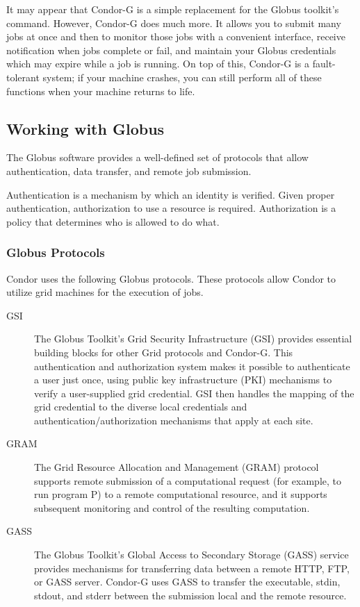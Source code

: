 It may appear that Condor-G is a simple replacement
for the Globus toolkit's  command.
However, Condor-G does much more.
It allows you to submit many jobs at once
and then to monitor those jobs with a convenient interface,
receive notification when jobs complete or fail,
and maintain your Globus credentials
which may expire while a job is running.
On top of this, Condor-G is a fault-tolerant system;
if your machine crashes,
you can still perform all of these functions when your machine returns to life.


\subsection{\label{sec:Globus-intro}Working with Globus}

The Globus software provides a well-defined set of protocols
that allow authentication, data transfer, and remote job submission.

Authentication is a mechanism by which an identity is verified.
Given proper authentication, authorization to use a resource
is required.
Authorization is a policy that determines who is allowed to do what. 


\subsubsection{\label{sec:Globus-Protocols}Globus Protocols}
Condor uses the following Globus protocols.
These protocols allow Condor to utilize grid machines for
the execution of jobs.
\begin{description}
\item[GSI]
The Globus Toolkit's Grid Security Infrastructure (GSI) provides essential
building blocks for other Grid protocols and Condor-G.
This authentication and authorization system
makes it possible to authenticate a user just once,
using public key infrastructure (PKI) mechanisms to verify
a user-supplied grid credential.
GSI then handles the mapping of the grid credential to the
diverse local credentials and authentication/authorization mechanisms that
apply at each site. 
\item[GRAM]
The Grid Resource Allocation and Management (GRAM) protocol supports remote
submission of a computational request (for example, to run program P)
to a remote computational resource,
and it supports subsequent monitoring and control of the resulting
computation. 
\item[GASS]
The Globus Toolkit's Global Access to Secondary Storage (GASS) service provides
mechanisms for transferring data between a remote HTTP, FTP, or GASS server. 
Condor-G uses GASS to transfer the executable, stdin, stdout, and stderr
between the submission local and the remote resource.
\end{description}

